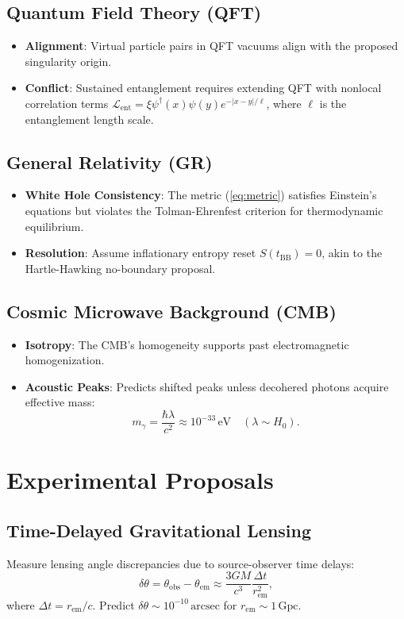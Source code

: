 \documentclass[12pt, a4paper]{article}
\begin{document}
\subsection{Quantum Field Theory (QFT)}
\begin{itemize}
\item \textbf{Alignment}: Virtual particle pairs in QFT vacuums align with the proposed singularity origin.
\item \textbf{Conflict}: Sustained entanglement requires extending QFT with nonlocal correlation terms \( \mathscr{L}_{\text{ent}} = \xi \psi^\dagger(x) \psi(y) e^{-|x-y|/\ell} \), where \( \ell \) is the entanglement length scale.
\end{itemize}

\subsection{General Relativity (GR)}
\begin{itemize}
\item \textbf{White Hole Consistency}: The metric (\ref{eq:metric}) satisfies Einstein's equations but violates the Tolman-Ehrenfest criterion for thermodynamic equilibrium.
\item \textbf{Resolution}: Assume inflationary entropy reset \( S(t_{\text{BB}}) = 0 \), akin to the Hartle-Hawking no-boundary proposal.
\end{itemize}

\subsection{Cosmic Microwave Background (CMB)}
\begin{itemize}
\item \textbf{Isotropy}: The CMB's homogeneity supports past electromagnetic homogenization.
\item \textbf{Acoustic Peaks}: Predicts shifted peaks unless decohered photons acquire effective mass:
\begin{equation}
m_{\gamma} = \frac{\hbar \lambda}{c^2} \approx 10^{-33} \, \text{eV} \quad (\lambda \sim H_0). \label{eq:photon_mass}
\end{equation}
\end{itemize}

\section{Experimental Proposals}
\subsection{Time-Delayed Gravitational Lensing}
Measure lensing angle discrepancies due to source-observer time delays:
\begin{equation}
\delta \theta = \theta_{\text{obs}} - \theta_{\text{em}} \approx \frac{3GM}{c^3} \frac{\Delta t}{r_{\text{em}}^2}, \label{eq:lensing}
\end{equation}
where \( \Delta t = r_{\text{em}}/c \). Predict \( \delta \theta \sim 10^{-10} \, \text{arcsec} \) for \( r_{\text{em}} \sim 1 \, \text{Gpc} \).
\end{document}
